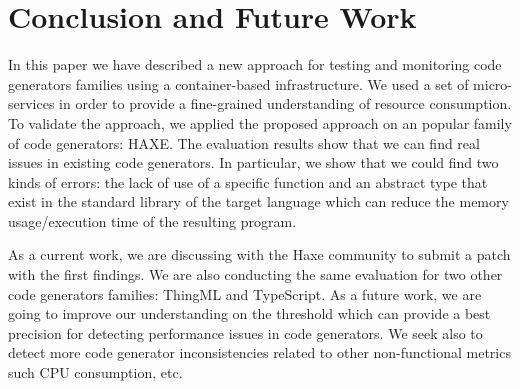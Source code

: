 \section{Conclusion and Future Work}

In this paper we have described a new approach for testing and monitoring code generators families using a container-based infrastructure. 
We used a set of micro-services in order to provide a fine-grained understanding of resource consumption. 
To validate the approach, we applied the proposed approach on an popular family of code generators: HAXE. 
The evaluation results show that we can find real issues in existing code generators. 
In particular, we show that we could find two kinds of errors: the lack of use of a specific function and an abstract type that exist in the standard library of the target language which can reduce the memory usage/execution time of the resulting program.

As a current work, we are discussing with the Haxe community to submit a patch with the first findings. 
We are also conducting the same evaluation for two other code generators families: ThingML and TypeScript. 
As a future work, we are going to improve our understanding on the threshold which can provide a best precision for detecting performance issues in code generators. 
We seek also to detect more code generator inconsistencies related to other non-functional metrics such CPU consumption, etc. 

